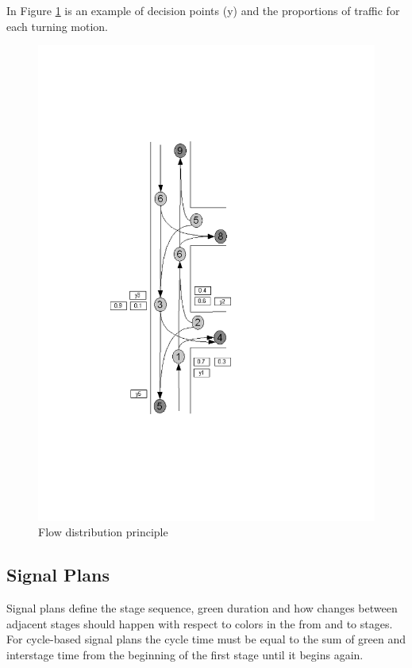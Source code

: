 In Figure \ref{fig:flow_dist_principle} is an example of decision points (y) and the proportions of traffic for each turning motion.
\begin{figure}[!ht]
\begin{center}
\includegraphics[scale=0.6]{trafficcount_to_routes_sketch.png} 
\end{center}
\caption{Flow distribution principle}
\label{fig:flow_dist_principle}
\end{figure}

\subsection{Signal Plans}
Signal plans define the stage sequence, green duration and how changes between adjacent stages should happen with respect to colors in the from and to stages. For cycle-based signal plans the cycle time must be equal to the sum of green and interstage time from the beginning of the first stage until it begins again.

